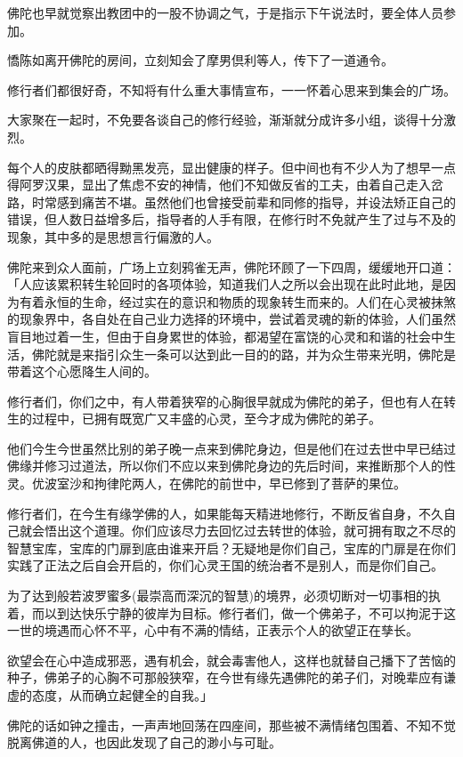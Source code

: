 \documentclass[12pt,twoside,openany]{book}
\begin{document}
佛陀也早就觉察出教团中的一股不协调之气，于是指示下午说法时，要全体人员参加。

憍陈如离开佛陀的房间，立刻知会了摩男倶利等人，传下了一道通令。

修行者们都很好奇，不知将有什么重大事情宣布，一一怀着心思来到集会的广场。

大家聚在一起时，不免要各谈自己的修行经验，渐渐就分成许多小组，谈得十分激烈。

每个人的皮肤都晒得黝黑发亮，显出健康的样子。但中间也有不少人为了想早一点得阿罗汉果，显出了焦虑不安的神情，他们不知做反省的工夫，由着自己走入岔路，时常感到痛苦不堪。虽然他们也曾接受前辈和同修的指导，并设法矫正自己的错误，但人数日益增多后，指导者的人手有限，在修行时不免就产生了过与不及的现象，其中多的是思想言行偏激的人。

佛陀来到众人面前，广场上立刻鸦雀无声，佛陀环顾了一下四周，缓缓地开口道：「人应该累积转生轮回时的各项体验，知道我们人之所以会出现在此时此地，是因为有着永恒的生命，经过实在的意识和物质的现象转生而来的。人们在心灵被抹煞的现象界中，各自处在自己业力选择的环境中，尝试着灵魂的新的体验，人们虽然盲目地过着一生，但由于自身累世的体验，都渴望在富饶的心灵和和谐的社会中生活，佛陀就是来指引众生一条可以达到此一目的的路，并为众生带来光明，佛陀是带着这个心愿降生人间的。

修行者们，你们之中，有人带着狭窄的心胸很早就成为佛陀的弟子，但也有人在转生的过程中，已拥有既宽广又丰盛的心灵，至今才成为佛陀的弟子。

他们今生今世虽然比别的弟子晚一点来到佛陀身边，但是他们在过去世中早已结过佛缘并修习过道法，所以你们不应以来到佛陀身边的先后时间，来推断那个人的性灵。优波室沙和拘律陀两人，在佛陀的前世中，早已修到了菩萨的果位。

修行者们，在今生有缘学佛的人，如果能每天精进地修行，不断反省自身，不久自己就会悟出这个道理。你们应该尽力去回忆过去转世的体验，就可拥有取之不尽的智慧宝库，宝库的门扉到底由谁来开启？无疑地是你们自己，宝库的门扉是在你们实践了正法之后自会开启的，你们心灵王国的统治者不是别人，而是你们自己。

为了达到般若波罗蜜多(最崇高而深沉的智慧)的境界，必须切断对一切事相的执着，而以到达快乐宁静的彼岸为目标。修行者们，做一个佛弟子，不可以拘泥于这一世的境遇而心怀不平，心中有不满的情结，正表示个人的欲望正在孳长。

欲望会在心中造成邪恶，遇有机会，就会毒害他人，这样也就替自己播下了苦恼的种子，佛弟子的心胸不可那般狭窄，在今世有缘先遇佛陀的弟子们，对晚辈应有谦虚的态度，从而确立起健全的自我。」

佛陀的话如钟之撞击，一声声地回荡在四座间，那些被不满情绪包围着、不知不觉脱离佛道的人，也因此发现了自己的渺小与可耻。
\end{document}
